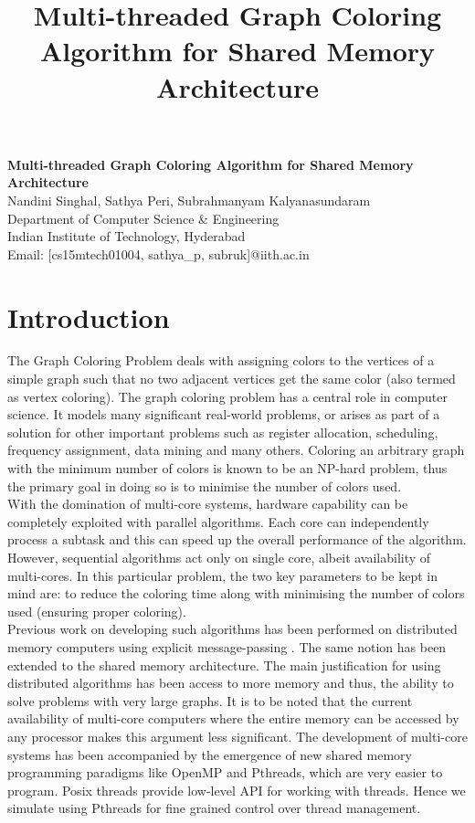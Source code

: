 \documentclass[a4paper,11pt]{article}
\title{Multi-threaded Graph Coloring Algorithm for Shared Memory Architecture}
\begin{document}
\begin{center}
\large{\textbf{Multi-threaded Graph Coloring Algorithm for Shared Memory Architecture}}\\
\vspace{3mm}
Nandini Singhal, Sathya Peri, Subrahmanyam Kalyanasundaram\\
Department of Computer Science \& Engineering\\
Indian Institute of Technology, Hyderabad\\
Email: [cs15mtech01004, sathya\_p, subruk]@iith.ac.in

\vspace{5mm}
\end{center}


\section{Introduction}
The Graph Coloring Problem deals with assigning colors to the vertices of a simple graph such that no two adjacent vertices get the same color (also termed as vertex coloring). The graph coloring problem has a central role in computer science. It models many significant real-world problems, or arises as part of a solution for other important problems such as register allocation, scheduling, frequency assignment, data mining and many others. Coloring an arbitrary graph with the minimum number of colors is known to be an NP-hard problem, thus the primary goal in doing so is to minimise the number of colors used.\\
\indent With the domination of multi-core systems, hardware capability can be completely exploited with parallel algorithms. Each core can independently process a subtask and this can speed up the overall performance of the algorithm. However, sequential algorithms act only on single core, albeit availability of multi-cores. In this particular problem, the two key parameters to be kept in mind are: to reduce the coloring time along with minimising the number of colors used (ensuring proper coloring).\\
\indent Previous work on developing such algorithms has been performed on distributed memory computers using explicit message-passing \cite{boman2005scalable}. The same notion has been extended to the shared memory architecture. The main justification for using distributed algorithms has been access to more memory and thus, the ability to solve problems with very large graphs. It is to be noted that the current availability of multi-core computers where the entire memory can be accessed by any processor makes this argument less significant. The development of multi-core systems has been accompanied by the emergence of new shared memory programming paradigms like OpenMP and Pthreads, which are very easier to program. Posix threads provide low-level API for working with threads. Hence we simulate using Pthreads for fine grained control over thread management.\\
\end{document}
